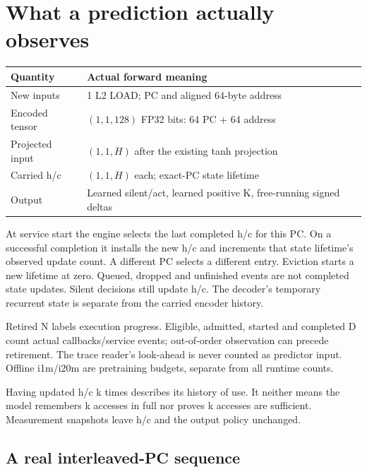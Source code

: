 \documentclass[10pt]{article}
\begin{document}
\clearpage\section{What a prediction actually observes}

\begin{center}\scriptsize
\begin{tabular}{ll}
\toprule
Quantity & Actual forward meaning \\
\midrule
New inputs & 1 L2 LOAD; PC and aligned 64-byte address \\
Encoded tensor & $(1,1,128)$ FP32 bits: 64 PC + 64 address \\
Projected input & $(1,1,H)$ after the existing tanh projection \\
Carried h/c & $(1,1,H)$ each; exact-PC state lifetime \\
Output & Learned silent/act, learned positive K, free-running signed deltas \\
\bottomrule
\end{tabular}\end{center}

At service start the engine selects the last completed h/c for this PC. On a successful completion it installs the new h/c and increments that state lifetime's observed update count. A different PC selects a different entry. Eviction starts a new lifetime at zero. Queued, dropped and unfinished events are not completed state updates. Silent decisions still update h/c. The decoder's temporary recurrent state is separate from the carried encoder history.

Retired N labels execution progress. Eligible, admitted, started and completed D count actual callbacks/service events; out-of-order observation can precede retirement. The trace reader's look-ahead is never counted as predictor input. Offline i1m/i20m are pretraining budgets, separate from all runtime counts.

Having updated h/c k times describes its history of use. It neither means the model remembers k accesses in full nor proves k accesses are sufficient. Measurement snapshots leave h/c and the output policy unchanged.

\subsection{A real interleaved-PC sequence}
\end{document}
